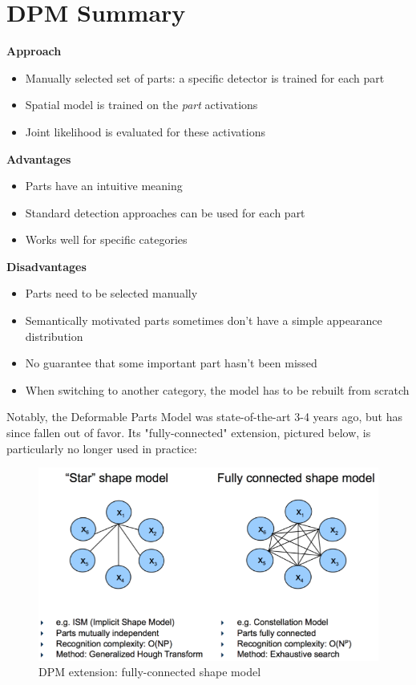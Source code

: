 \documentclass{article}
\begin{document}
\section{DPM Summary}
  \textbf{Approach}
  \begin{itemize}
  \item Manually selected set of parts: a specific detector is trained for each part
  \item Spatial model is trained on the \textit{part} activations
  \item Joint likelihood is evaluated for these activations
  \end{itemize}

  \textbf{Advantages}
  \begin{itemize}
  \item Parts have an intuitive meaning
  \item Standard detection approaches can be used for each part
  \item Works well for specific categories
  \end{itemize}

  \textbf{Disadvantages}
  \begin{itemize}
  \item Parts need to be selected manually
  \item Semantically motivated parts sometimes don’t have a simple appearance distribution 
  \item No guarantee that some important part hasn’t been missed
  \item When switching to another category, the model has to be rebuilt from scratch
  \end{itemize}

  Notably, the Deformable Parts Model was state-of-the-art 3-4 years ago, but has since fallen out of favor. Its "fully-connected" extension, pictured below, is particularly no longer used in practice:

  \begin{figure}[h!]
      \center
      \includegraphics[scale=0.55]{fullyconnected.png}
      \caption{DPM extension: fully-connected shape model}
      \label{fig:fullyconnected}
  \end{figure}

\small


\end{document}
